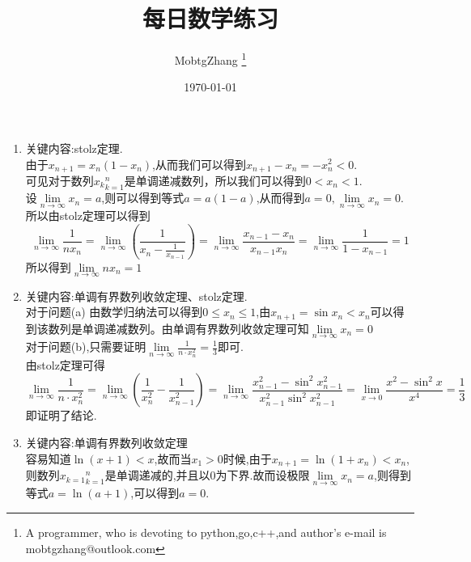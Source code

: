 \documentclass[UTF8,a4paper,10pt]{ctexart}
\title{每日数学练习}
\author{ MobtgZhang \thanks{A programmer, who is devoting to python,go,c++,and author's e-mail is mobtgzhang@outlook.com} }
\date{\today}
\begin{document}
	\maketitle
	\thispagestyle{fancy}
	\begin{flushleft}
		\begin{enumerate}
			\item 关键内容:stolz定理.\\
				由于$x_{n+1}=x_{n}(1-x_{n})$,从而我们可以得到$x_{n+1}-x_{n}=-x_{n}^{2}<0$.\\
				可见对于数列${x_{k}}_{k=1}^{n}$是单调递减数列，所以我们可以得到$0<x_{n}<1$.\\
				设$\lim\limits_{n\rightarrow\infty}x_{n}=a$,则可以得到等式$a=a(1-a)$,从而得到$a=0,\lim\limits_{n\rightarrow\infty}x_{n}=0$.\\
				所以由stolz定理可以得到
				\begin{equation}
					\lim\limits_{n\rightarrow\infty}\frac{1}{nx_{n}}=\lim\limits_{n\rightarrow\infty}(\frac{1}{x_{n}-\frac{1}{x_{n-1}}})
					=\lim\limits_{n\rightarrow\infty}\frac{x_{n-1}-x_{n}}{x_{n-1}x_{n}}=\lim\limits_{n\rightarrow\infty}\frac{1}{1-x_{n-1}}=1\nonumber
				\end{equation}
				所以得到$\lim\limits_{n\rightarrow\infty}nx_{n}=1$
			\item 关键内容:单调有界数列收敛定理、stolz定理.\\
			对于问题(a) 由数学归纳法可以得到$0\leq{x_{n}}\leq{1}$,由$x_{n+1}=\sin{x_{n}}<x_{n}$可以得到该数列是单调递减数列。由单调有界数列收敛定理可知$\lim\limits_{n\rightarrow\infty}x_{n}=0$\\
			对于问题(b),只需要证明$\lim\limits_{n\rightarrow\infty}\frac{1}{n\cdot{x_{n}^{2}}}=\frac{1}{3}$即可.\\
			由stolz定理可得
			\begin{equation}
				\lim\limits_{n\rightarrow\infty}\frac{1}{n\cdot{x_{n}^{2}}}=\lim\limits_{n\rightarrow\infty}(\frac{1}{x_{n}^{2}}-\frac{1}{x_{n-1}^{2}})
				=\lim\limits_{n\rightarrow\infty}\frac{x_{n-1}^{2}-\sin^{2}x_{n-1}^{2}}{x_{n-1}^{2}\sin^{2}x_{n-1}^{2}}
				=\lim\limits_{x\rightarrow{0}}\frac{x^{2}-\sin^{2}x}{x^{4}}=\frac{1}{3}\nonumber
			\end{equation}
			即证明了结论.
			\item 关键内容:单调有界数列收敛定理\\
			容易知道$\ln{(x+1)}<x$,故而当$x_{1}>0$时候,由于$x_{n+1}=\ln(1+x_{n})<x_{n}$,则数列${x_{k=1}}_{k=1}^{n}$是单调递减的,并且以0为下界.故而设极限$\lim\limits_{n\rightarrow\infty}x_{n}=a$,则得到等式$a=\ln(a+1)$,可以得到$a=0$.\\

\end{enumerate}
\end{flushleft}
\end{document}

